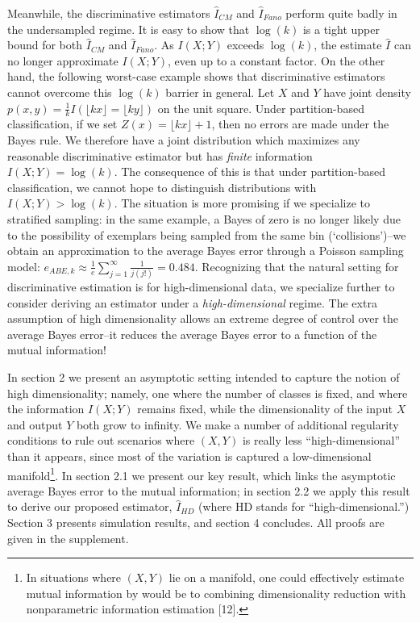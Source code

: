 \documentclass{article}
\begin{document}
Meanwhile, the discriminative estimators $\hat{I}_{CM}$ and
$\hat{I}_{Fano}$ perform quite badly in the undersampled regime.  It
is easy to show that $\log(k)$ is a tight upper bound for both
$\hat{I}_{CM}$ and $\hat{I}_{Fano}$.  As $I(X; Y)$ exceeds $\log(k)$,
the estimate $\hat{I}$ can no longer approximate $I(X; Y)$, even up to
a constant factor.  On the other hand, the following worst-case
example shows that discriminative estimators cannot overcome this
$\log(k)$ barrier in general.  Let $X$ and $Y$ have joint density $
p(x, y) = \frac{1}{k}I(\lfloor kx \rfloor = \lfloor ky \rfloor) $ on
the unit square.  Under partition-based classification, if we set
$Z(x) = \lfloor kx \rfloor + 1$, then no errors are made under the
Bayes rule. We therefore have a joint distribution which maximizes any
reasonable discriminative estimator but has \emph{finite} information
$I(X; Y) = \log(k)$.  The consequence of this is that under
partition-based classification, we cannot hope to distinguish
distributions with $I(X; Y) > \log(k)$.  The situation is more
promising if we specialize to stratified sampling: in the same
example, a Bayes of zero is no longer likely due to the possibility of
exemplars being sampled from the same bin (`collisions')--we obtain an
approximation to the average Bayes error through a Poisson sampling
model: $e_{ABE, k} \approx \frac{1}{e}\sum_{j=1}^\infty
\frac{1}{j(j!)}= 0.484$.  Recognizing that the natural setting for
discriminative estimation is for high-dimensional data, we specialize
further to consider deriving an estimator under a
\emph{high-dimensional} regime.  The extra assumption of high
dimensionality allows an extreme degree of control over the average
Bayes error--it reduces the average Bayes error to a function of the
mutual information!

In section 2 we present an asymptotic setting intended to capture the
notion of high dimensionality; namely, one where the number of classes
is fixed, and where the information $I(X; Y)$ remains fixed, while the
dimensionality of the input $X$ and output $Y$ both grow to infinity.
We make a number of additional regularity conditions to rule out
scenarios where $(X, Y)$ is really less ``high-dimensional'' than it
appears, since most of the variation is captured a low-dimensional
manifold\footnote{In situations where $(X, Y)$ lie on a manifold, one
  could effectively estimate mutual information by would be to
  combining dimensionality reduction with nonparametric information
  estimation [12]. }.  In section 2.1 we
present our key result, which links the asymptotic average Bayes error
to the mutual information; in section 2.2 we apply this result to
derive our proposed estimator, $\hat{I}_{HD}$ (where HD stands for
``high-dimensional.'')  Section 3 presents simulation results, and
section 4 concludes.  All proofs are given in the supplement.
\end{document}
